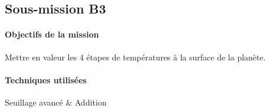 \subsection{Sous-mission B3}

	\begin{vwcol}[widths={0.65,0.2}, rule=0pt]
	\begin{minipage}{0.7\textwidth}
	\paragraph{Objectifs de la mission}

	Mettre en valeur les 4 étapes de températures à la surface de la planète. 
	\end{minipage}

	\begin{minipage}{0.25\textwidth}
	\begin{flushright}
	\paragraph{Techniques utilisées}
	
	Seuillage avancé \& Addition
	\end{flushright}
	\end{minipage}

	\end{vwcol} 

